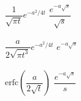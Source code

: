 \documentclass[nobib]{tufte-handout}
\begin{document}
\begin{center}
\begin{table}
\begin{tabbing}
            $\dfrac{1}{\sqrt{\pi t}}e^{-a^2/4t}$	\> $\dfrac{e^{-a\sqrt{s}}}{\sqrt{s}}$ \> \LTNUM \\ \\
            $\dfrac{a}{2\sqrt{\pi t^3}}e^{-a^2/4t}$	\> $e^{-a\sqrt{s}}$ \> \LTNUM \\ \\
            $\text{erfc}\left(\dfrac{a}{2\sqrt{t}}\right)$ \>  $\dfrac{e^{-a\sqrt{s}}}{s}$ \> \LTNUM \\ \\
        \end{tabbing}
    \end{table}
\end{center}
\end{document}

